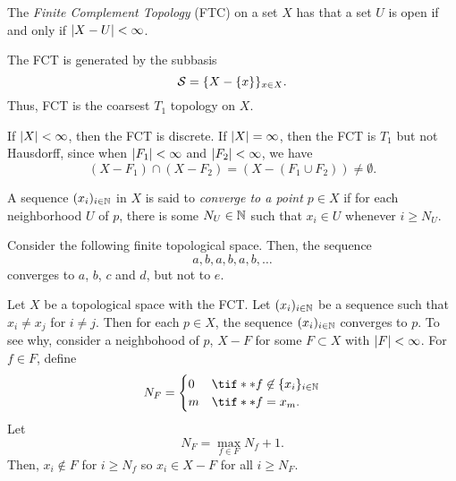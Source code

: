 \documentclass[12pt]{book} %
\begin{document}
\begin{definition}
The \emph{Finite Complement Topology} (FTC) on a set \( X \) has that a set \( U \) is open if and only if \( \lvert X - U\rvert < \infty \).
\end{definition}

\begin{remark}
The FCT is generated by the subbasis
\[ \mathcal S = \{X -\{x\}\}_{x \in X}. \]
Thus, FCT is the coarsest \( T_1 \) topology on \( X \).
\end{remark}

\begin{example}
If \( \lvert X\rvert < \infty \), then the FCT is discrete.
If \( \lvert X\rvert = \infty \), then the FCT is \( T_1 \) but not Hausdorff, since when \( \lvert F_1\rvert < \infty \) and \( \lvert F_2\rvert < \infty \), we have
\[ ( X - F_1) \cap (X - F_2) = (X - (F_1 \cup F_2)) \neq \emptyset. \]
\end{example}

\begin{definition}
A sequence \( (x_i)_{i \in \mathbb{N}} \) in \( X \) is said to \emph{converge to a point \( p \in X \)} if for each neighborhood \( U \) of \( p \), there is some \( N_U \in \mathbb{N} \) such that \( x_i \in U \) whenever \( i \geq N_U \).
\end{definition}

\begin{example}
Consider the following finite topological space.
Then, the sequence
\[ a, b, a, b, a, b, \ldots \]
converges to \( a \), \( b \), \( c \) and \( d \), but not to \( e \).
\end{example}

\begin{example}
Let \( X \) be a topological space with the FCT.
Let \( (x_i)_{i \in \mathbb{N}} \) be a sequence such that \( x_i \neq x_j \) for \( i \neq j \).
Then for each \( p \in X \), the sequence \( (x_i)_{i \in \mathbb{N}} \) converges to \( p \).
To see why, consider a neighbohood of \( p \), \( X - F \) for some \( F \subset X \) with \( \lvert F\rvert < \infty \).
For \( f \in F \), define
\[ N_F = \begin{cases} 0 &\tif** f \not \in \set{x_i}_{i\in\N} \\ m &\tif** f = x_m. \end{cases} \]
Let
\[ N_F = \max_{f \in F} N_f + 1. \]
Then, \( x_i \not \in F \) for \( i \geq N_f \) so \( x_i \in X - F \) for all \( i \geq N_F \).
\end{example}
\end{document}
